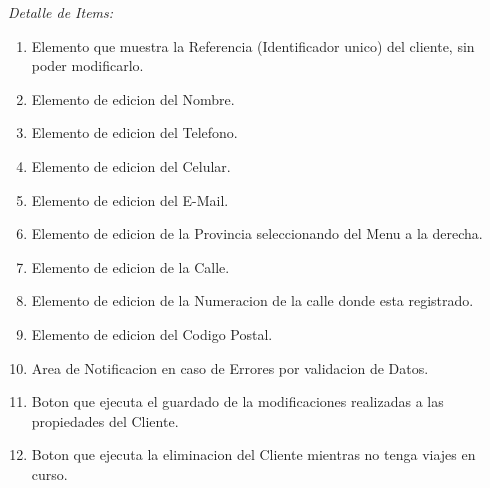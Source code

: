 \documentclass[
10pt, %
a4paper, %
oneside, %
headinclude,footinclude, %
BCOR5mm, %
]{scrartcl}
\begin{document}
 \emph{Detalle de Items:}
 \begin{enumerate}
   \item  Elemento que muestra la Referencia (Identificador unico) del cliente,
      sin poder modificarlo.
   \item  Elemento de edicion del Nombre.
   \item  Elemento de edicion del Telefono.
   \item  Elemento de edicion del Celular.
   \item  Elemento de edicion del E-Mail.
   \item  Elemento de edicion de la Provincia seleccionando
      del Menu a la derecha.
   \item  Elemento de edicion de la Calle.
   \item  Elemento de edicion de la Numeracion de la calle donde esta registrado.
   \item  Elemento de edicion del Codigo Postal.
   \item  Area de Notificacion en caso de Errores por validacion de Datos.
   \item  Boton que ejecuta el guardado de la modificaciones realizadas a las
     propiedades del Cliente.
   \item  Boton que ejecuta la eliminacion del Cliente mientras
    no tenga viajes en curso.
  \end{enumerate}
\end{document}
